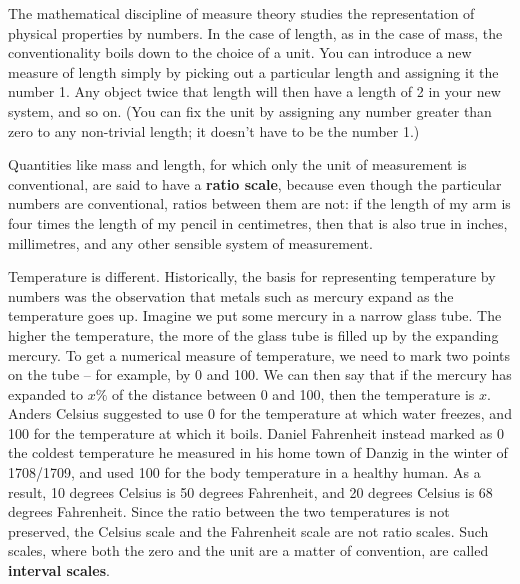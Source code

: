 The mathematical discipline of measure theory studies the
representation of physical properties by numbers. In the case of
length, as in the case of mass, the conventionality boils down to the
choice of a unit. You can introduce a new measure of length simply by
picking out a particular length and assigning it the number 1. Any
object twice that length will then have a length of 2 in your new
system, and so on. (You can fix the unit by assigning any number
greater than zero to any non-trivial length; it doesn't have to be the
number 1.)

Quantities like mass and length, for which only the unit of
measurement is conventional, are said to have a \textbf{ratio scale},
because even though the particular numbers are conventional, ratios
between them are not: if the length of my arm is four times the length
of my pencil in centimetres, then that is also true in inches,
millimetres, and any other sensible system of measurement.

Temperature is different. Historically, the basis for representing
temperature by numbers was the observation that metals such as mercury
expand as the temperature goes up. Imagine we put some mercury in a
narrow glass tube. The higher the temperature, the more of the glass
tube is filled up by the expanding mercury. To get a numerical measure
of temperature, we need to mark two points on the tube -- for example,
by 0 and 100. We can then say that if the mercury has expanded to
$x\%$ of the distance between 0 and 100, then the temperature is
$x$. Anders Celsius suggested to use 0 for the temperature at which
water freezes, and 100 for the temperature at which it boils. Daniel
Fahrenheit instead marked as 0 the coldest temperature he measured in
his home town of Danzig in the winter of 1708/1709, and used 100 for
the body temperature in a healthy human. As a result, 10 degrees
Celsius is 50 degrees Fahrenheit, and 20 degrees Celsius is 68 degrees
Fahrenheit. Since the ratio between the two temperatures is not
preserved, the Celsius scale and the Fahrenheit scale are not ratio
scales.%
Such scales, where both the zero and the unit are a matter of
convention, are called \textbf{interval scales}.


